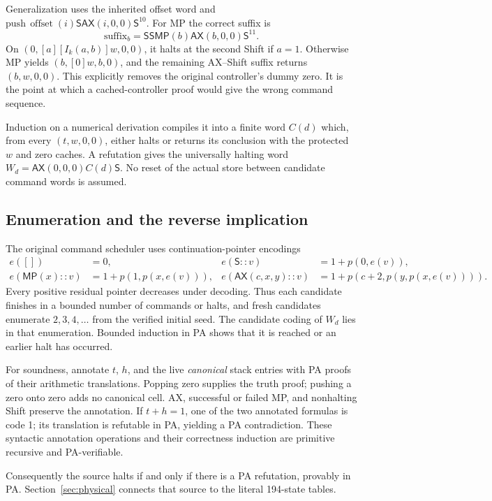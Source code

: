 \documentclass[11pt,letterpaper]{article}
\newcommand{\AX}{\mathsf{AX}}
\newcommand{\MP}{\mathsf{MP}}
\newcommand{\Shift}{\mathsf S}
\begin{document}
Generalization uses the inherited offset word and
$\mathrm{push}\,\operatorname{offset}(i)\Shift\AX(i,0,0)\Shift^{10}$.
For MP the correct suffix is
\[
 \mathrm{suffix}_b=\Shift\Shift\MP(b)\AX(b,0,0)\Shift^{11}.
\]
On $(0,[a][I_k(a,b)]w,0,0)$, it halts at the second Shift if $a=1$.
Otherwise MP yields $(b,[0]w,b,0)$, and the remaining AX--Shift suffix
returns $(b,w,0,0)$. This explicitly removes the original controller's
dummy zero. It is the point at which a cached-controller proof would give
the wrong command sequence.

Induction on a numerical derivation compiles it into a finite word
$C(d)$ which, from every $(t,w,0,0)$, either halts or returns its conclusion
with the protected $w$ and zero caches. A refutation gives the universally
halting word $W_d=\AX(0,0,0)C(d)\Shift$. No reset of the actual store
between candidate command words is assumed.

\subsection{Enumeration and the reverse implication}

The original command scheduler uses continuation-pointer encodings
\begin{align*}
e([])&=0,&e(\Shift::v)&=1+p(0,e(v)),\\
e(\MP(x)::v)&=1+p(1,p(x,e(v))),&
e(\AX(c,x,y)::v)&=1+p(c+2,p(y,p(x,e(v)))).
\end{align*}
Every positive residual pointer decreases under decoding. Thus each
candidate finishes in a bounded number of commands or halts, and fresh
candidates enumerate $2,3,4,\ldots$ from the verified initial seed.
The candidate coding of $W_d$ lies in that enumeration. Bounded induction
in PA shows that it is reached or an earlier halt has occurred.

For soundness, annotate $t$, $h$, and the live \emph{canonical} stack
entries with PA proofs of their arithmetic translations. Popping zero
supplies the truth proof; pushing a zero onto zero adds no canonical
cell. AX, successful or failed MP, and nonhalting Shift preserve the
annotation. If $t+h=1$, one of the two annotated formulas is code 1;
its translation is refutable in PA, yielding a PA contradiction.
These syntactic annotation operations and their correctness induction
are primitive recursive and PA-verifiable.

Consequently the source halts if and only if there is a PA refutation,
provably in PA. Section~\ref{sec:physical} connects that source to the
literal 194-state tables.
\end{document}
